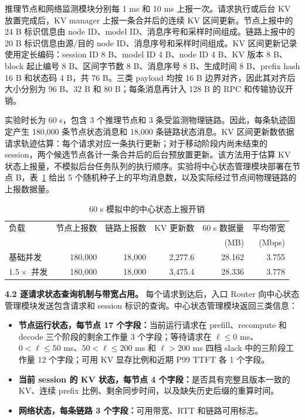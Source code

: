 推理节点和网络监测模块分别每 1 ms 和 10 ms 上报一次。请求执行或后台 KV 放置完成后，KV manager 上报一条合并后的连续 KV 区间更新。节点上报中的 24 B 标识信息由 node ID、model ID、消息序号和采样时间组成。链路上报中的 20 B 标识信息由源/目的 node ID、消息序号和采样时间组成。KV 区间更新记录使用定长编码：session ID 8 B、model ID 4 B、node ID 4 B、KV 版本 8 B、block 起止编号 8 B、区间字节数 8 B、消息序号 8 B、生成时间 8 B、prefix hash 16 B 和状态码 4 B，共 76 B。三类 payload 均按 16 B 边界对齐，因此其对齐后大小分别为 96 B、32 B 和 80 B；每条消息再计入 128 B 的 RPC 和传输协议开销。

实验时长为 60 s，包含 3 个推理节点和 3 条受监测物理链路。因此，每条轨迹固定产生 180,000 条节点状态消息和 18,000 条链路状态消息。KV 区间更新数依据请求轨迹估算：每个请求对应一条执行更新；对于移动阶段内尚未结束的 session，两个候选节点各计一条合并后的后台预放置更新。该方法用于估算 KV 状态上报量，不模拟后台任务队列的执行顺序。实验将中心状态管理模块部署在节点 B，表~\ref{tab:control-plane-upload-results} 给出 5 个随机种子上的平均消息数，以及实际经过节点间物理链路的上报数据量。

\begin{table}[H]
\centering
\small
\caption{60 s 模拟中的中心状态上报开销}
\label{tab:control-plane-upload-results}
\begin{tabular}{@{}lrrrrr@{}}
\toprule
负载
& 节点上报数
& 链路上报数
& KV 更新数
& 60 s 数据量
& 平均带宽 \\
&
&
&
&
(MB)
& (Mbps) \\
\midrule
基础并发
& 180,000 & 18,000 & 2,277.6 & 28.162 & 3.755 \\
\(1.5\times\) 并发
& 180,000 & 18,000 & 3,475.4 & 28.336 & 3.778 \\
\bottomrule
\end{tabular}
\end{table}

\textbf{4.2 逐请求状态查询机制与带宽占用。}
每个请求到达后，入口 Router 向中心状态管理模块发送包含请求和 session 标识的查询。中心状态管理模块返回三类信息：
\begin{itemize}
    \item \textbf{节点运行状态，每节点 17 个字段：}当前运行请求在 prefill、recompute 和 decode 三个阶段的剩余工作量 3 个字段；等待请求在 \(\ell\leq0\) ms、\(0<\ell\leq50\) ms、\(50<\ell\leq200\) ms 和 \(\ell>200\) ms 四档 slack 中的三阶段工作量 12 个字段；可用 KV 显存比例和近期 P99 TTFT 各 1 个字段。
    \item \textbf{当前 session 的 KV 状态，每节点 4 个字段：}是否具有完整且版本一致的 KV、连续 prefix 比例、剩余同步时间，以及缺失历史后缀的重算时间。
    \item \textbf{网络状态，每条链路 3 个字段：}可用带宽、RTT 和链路可用标志。
\end{itemize}

